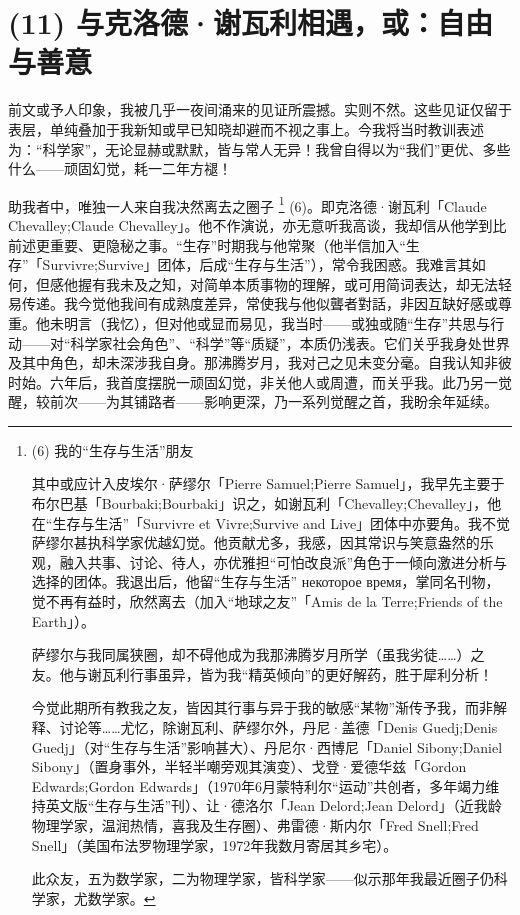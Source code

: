 \section{(11) 与克洛德·谢瓦利相遇，或：自由与善意}

前文或予人印象，我被几乎一夜间涌来的见证所震撼。实则不然。这些见证仅留于表层，单纯叠加于我新知或早已知晓却避而不视之事上。今我将当时教训表述为：“科学家”，无论显赫或默默，皆与常人无异！我曾自得以为“我们”更优、多些什么——顽固幻觉，耗一二年方褪！

助我者中，唯独一人来自我决然离去之圈子 \footnote{(6) 我的“生存与生活”朋友 \par
其中或应计入皮埃尔·萨缪尔「Pierre Samuel;Pierre Samuel」，我早先主要于布尔巴基「Bourbaki;Bourbaki」识之，如谢瓦利「Chevalley;Chevalley」，他在“生存与生活”「Survivre et Vivre;Survive and Live」团体中亦要角。我不觉萨缪尔甚执科学家优越幻觉。他贡献尤多，我感，因其常识与笑意盎然的乐观，融入共事、讨论、待人，亦优雅担“可怕改良派”角色于一倾向激进分析与选择的团体。我退出后，他留“生存与生活” некоторое время，掌同名刊物，觉不再有益时，欣然离去（加入“地球之友”「Amis de la Terre;Friends of the Earth」）。

萨缪尔与我同属狭圈，却不碍他成为我那沸腾岁月所学（虽我劣徒……）之友。他与谢瓦利行事虽异，皆为我“精英倾向”的更好解药，胜于犀利分析！

今觉此期所有教我之友，皆因其行事与异于我的敏感“某物”渐传予我，而非解释、讨论等……尤忆，除谢瓦利、萨缪尔外，丹尼·盖德「Denis Guedj;Denis Guedj」（对“生存与生活”影响甚大）、丹尼尔·西博尼「Daniel Sibony;Daniel Sibony」（置身事外，半轻半嘲旁观其演变）、戈登·爱德华兹「Gordon Edwards;Gordon Edwards」（1970年6月蒙特利尔“运动”共创者，多年竭力维持英文版“生存与生活”刊）、让·德洛尔「Jean Delord;Jean Delord」（近我龄物理学家，温润热情，喜我及生存圈）、弗雷德·斯内尔「Fred Snell;Fred Snell」（美国布法罗物理学家，1972年我数月寄居其乡宅）。

此众友，五为数学家，二为物理学家，皆科学家——似示那年我最近圈子仍科学家，尤数学家。} (6)。即克洛德·谢瓦利「Claude Chevalley;Claude Chevalley」。他不作演说，亦无意听我高谈，我却信从他学到比前述更重要、更隐秘之事。“生存”时期我与他常聚（他半信加入“生存”「Survivre;Survive」团体，后成“生存与生活”），常令我困惑。我难言其如何，但感他握有我未及之知，对简单本质事物的理解，或可用简词表达，却无法轻易传递。我今觉他我间有成熟度差异，常使我与他似聾者對話，非因互缺好感或尊重。他未明言（我忆），但对他或显而易见，我当时——或独或随“生存”共思与行动——对“科学家社会角色”、“科学”等“质疑”，本质仍浅表。它们关乎我身处世界及其中角色，却未深涉我自身。那沸腾岁月，我对己之见未变分毫。自我认知非彼时始。六年后，我首度摆脱一顽固幻觉，非关他人或周遭，而关乎我。此乃另一觉醒，较前次——为其铺路者——影响更深，乃一系列觉醒之首，我盼余年延续。

